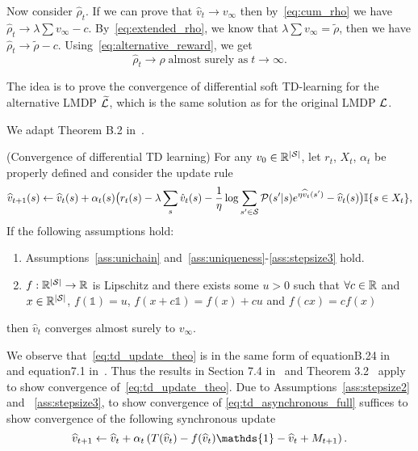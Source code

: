 Now consider $\hat\rho_t$. If we can prove that $\hat v_t\rightarrow v_\infty$ then by~\eqref{eq:cum_rho} we have $\hat\rho_t\rightarrow\lambda\sum v_\infty - c$. By~\eqref{eq:extended_rho}, we know that $\lambda\sum v_\infty = \widetilde\rho$, then we have $\hat\rho_t\rightarrow\widetilde\rho-c$. Using~\eqref{eq:alternative_reward}, we get 
\begin{equation*}
    \hat\rho_t\rightarrow\rho\;\text{almost surely as}\;t\rightarrow\infty.
\end{equation*}

The idea is to prove the convergence of differential soft TD-learning for the alternative LMDP $\widetilde{\mathcal{L}}$, which is the same solution as for the original LMDP $\mathcal{L}$.

We adapt Theorem B.2 in~\cite{Wan2021}.

\begin{theorem} (Convergence of differential TD learning)
    For any $v_0\in\mathbb{R}^{\lvert\mathcal{S}\rvert}$, let $r_t$, $X_t$, $\alpha_t$ be properly defined and consider the update rule
    \begin{equation}
        \widehat{v}_{t+1}(s) \gets \widehat{v}_t(s) + \alpha_t(s) \big( r_t(s) - \lambda\sum_s \hat v_t(s) - \frac 1 \eta \log \sum_{s'\in\mathcal{S}} \mathcal{P}(s'|s) e^{\eta \widehat{v}_t(s')} - \widehat{v}_t(s)\big)  \mathbb{I}\{s\in X_t\},
        \label{eq:td_update_theo}
    \end{equation}
    If the following assumptions hold:
    \begin{enumerate}
        \item Assumptions~\ref{ass:unichain} and~\ref{ass:uniqueness}-\ref{ass:stepsize3} hold.
        \item $f:\mathbb{R}^{\lvert\mathcal{S}\rvert}\rightarrow\mathbb{R}$ is Lipschitz and there exists some $u>0$ such that $\forall c\in\mathbb{R}$ and $x\in\mathbb{R}^{\lvert\mathcal{S}\rvert}$, $f(\mathds{1})=u$, $f(x + c\mathds{1})=f(x)+cu$ and $f(cx) = c f(x)$
    \end{enumerate}
    then $\hat v_t$ converges almost surely to $v_\infty$.
    \label{theo:our_theorem}
\end{theorem}

We observe that~\eqref{eq:td_update_theo} is in the same form of equationB.24 in~\cite{Wan2021} and equation7.1 in~\cite{Borkar2009}. Thus the results in Section 7.4 in~\cite{Borkar2009} and Theorem 3.2~\cite{Borkar1998} apply to show convergence of~\eqref{eq:td_update_theo}. Due to Assumptions~\ref{ass:stepsize2} and ~\ref{ass:stepsize3}, to show convergence of \eqref{eq:td_asynchronous_full} suffices to show convergence of the following synchronous update
\begin{equation}
    \widehat{v}_{t+1} \gets \widehat{v}_t + \alpha_t \pa{ T(\widehat{v}_t) - f(\widehat{v}_t) \mathds{1} - \widehat{v}_t + M_{t+1}}.
    \label{eq:synchronous}
\end{equation}

